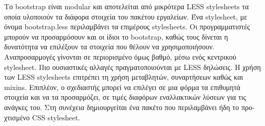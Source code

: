 	Το bootstrap είναι modular και αποτελείται από μικρότερα LESS stylesheets τα οποία υλοποιούν τα διάφορα στοιχεία του πακέτου εργαλείων. Ένα stylesheet, με όνομα bootstrap.less περιλαμβάνει τα επιμέρους stylesheets. Οι προγραμματιστές μπορούν να προσαρμόσουν και οι ίδιοι το bootstrap, καθώς τους δίνεται η δυνατότητα να επιλέξουν τα στοιχεία που θέλουν να χρησιμοποιήσουν. Αναπροσαρμογές γίνονται σε περιορισμένο όμως βαθμό, μέσω ενός κεντρικού stylesheet. Πιο ουσιαστικές αλλαγές πραγματοποιούνται με LESS δηλώσεις. Η χρήση των LESS stylesheets επιτρέπει τη χρήση μεταβλητών, συναρτήσεων καθώς και mixins. Επιπλέον, ο σχεδιαστής μπορεί να επιλέγει σε μια φόρμα τα επιθυμητά στοιχεία και να τα προσαρμόζει, σε τιμές διαφόρων εναλλακτικών λύσεων για τις ανάγκες του. Στη συνέχεια δημιουργείται ένα πακέτο που περιλαμβάνει ήδη το προ-χτισμένο CSS stylesheet.
	
